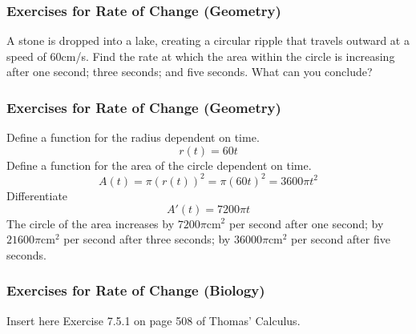 \documentclass[xcolor=dvipsnames]{beamer}
\begin{document}
\begin{frame}
  \frametitle{Exercises for Rate of Change (Geometry)}
A stone is dropped into a lake, creating a circular ripple that
travels outward at a speed of 60cm/s. Find the rate at which the area
within the circle is increasing after one second; three seconds; and
five seconds. What can you conclude?
\end{frame}

\begin{frame}
  \frametitle{Exercises for Rate of Change (Geometry)}
  Define a function for the radius dependent on time.
  \begin{equation}
    \label{eq:zoozohte}
    r(t)=60t
  \end{equation}
  Define a function for the area of the circle dependent on time.
  \begin{equation}
    \label{eq:maeneong}
    A(t)=\pi(r(t))^{2}=\pi(60t)^{2}=3600\pi{}t^{2}
  \end{equation}
  Differentiate
  \begin{equation}
    \label{eq:cheemahv}
    A'(t)=7200\pi{}t
  \end{equation}
  The circle of the area increases by $7200\pi$cm$^{2}$ per second
  after one second; by $21600\pi$cm$^{2}$ per second after three
  seconds; by $36000\pi$cm$^{2}$ per second after five seconds.
\end{frame}

\begin{frame}
  \frametitle{Exercises for Rate of Change (Biology)}
Insert here Exercise 7.5.1 on page 508 of Thomas' Calculus.
\end{frame}
\end{document}
